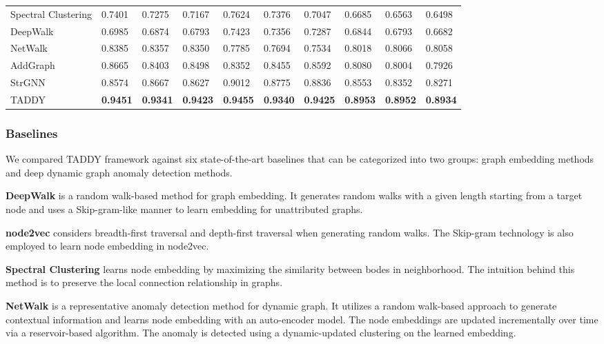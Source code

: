 \documentclass[10pt,journal,compsoc]{IEEEtran}
\newcommand{\HL}{}
\begin{document}
\begin{table}[t]
\begin{tabular}{l|p{30 pt}<{\centering}p{30 pt}<{\centering}p{30 pt}<{\centering}|p{30 pt}<{\centering}p{30 pt}<{\centering}p{30 pt}<{\centering}|p{30 pt}<{\centering}p{30 pt}<{\centering}p{30 pt}<{\centering}}
Spectral Clustering & 0.7401 & 0.7275 & 0.7167 & 0.7624 & 0.7376 & 0.7047 & 0.6685 & 0.6563 & 0.6498\\
DeepWalk            & 0.6985 & 0.6874 & 0.6793 & 0.7423 & 0.7356 & 0.7287 & 0.6844 & 0.6793 & 0.6682\\
    \hline
NetWalk             & 0.8385 & 0.8357 & 0.8350 & 0.7785 & 0.7694 & 0.7534 & 0.8018 & 0.8066 & 0.8058 \\
\HL{AddGraph}            & 0.8665 & 0.8403 & 0.8498 & 0.8352 & 0.8455 & 0.8592 & 0.8080 & 0.8004 & 0.7926 \\
StrGNN              & 0.8574 & 0.8667 & 0.8627 & 0.9012 & 0.8775 & 0.8836 & 0.8553 & 0.8352 & 0.8271 \\
    \hline
TADDY               & \bf{0.9451} & \bf{0.9341} & \bf{0.9423} & \bf{0.9455} & \bf{0.9340} & \bf{0.9425} & \bf{0.8953} & \bf{0.8952} & \bf{0.8934} \\
    \toprule
  \end{tabular}
  \vspace{-2mm}
\end{table}


\subsubsection{Baselines}

We compared TADDY framework against \HL{six} state-of-the-art baselines that can be categorized into two groups: graph embedding methods and deep dynamic graph anomaly detection methods.

\textbf{DeepWalk} \cite{perozzi2014deepwalk} is a random walk-based method for graph embedding. It generates random walks with a given length starting from a target node and uses a Skip-gram-like manner to learn embedding for unattributed graphs.

\textbf{node2vec} \cite{grover2016node2vec} considers breadth-first traversal and depth-first traversal when generating random walks. The Skip-gram technology is also employed to learn node embedding in node2vec.

\textbf{Spectral Clustering} \cite{von2007tutorial} learns node embedding by maximizing the similarity between bodes in neighborhood. The intuition behind this method is to preserve the local connection relationship in graphs.

\textbf{NetWalk} \cite{yu2018netwalk} is a representative anomaly detection method for dynamic graph. It utilizes a random walk-based approach to generate contextual information and learns node embedding with an auto-encoder model. The node embeddings are updated incrementally over time via a reservoir-based algorithm. The anomaly is detected using a dynamic-updated clustering on the learned embedding.
\end{document}

